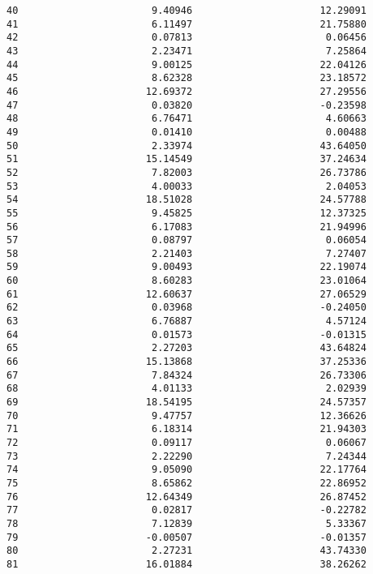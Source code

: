 \documentclass[11pt]{article}
\begin{document}
\begin{tcolorbox}[breakable, size=fbox, boxrule=.5pt, pad at break*=1mm, opacityfill=0]
\begin{Verbatim}[commandchars=\\\{\}]
40                       9.40946                      12.29091
41                       6.11497                      21.75880
42                       0.07813                       0.06456
43                       2.23471                       7.25864
44                       9.00125                      22.04126
45                       8.62328                      23.18572
46                      12.69372                      27.29556
47                       0.03820                      -0.23598
48                       6.76471                       4.60663
49                       0.01410                       0.00488
50                       2.33974                      43.64050
51                      15.14549                      37.24634
52                       7.82003                      26.73786
53                       4.00033                       2.04053
54                      18.51028                      24.57788
55                       9.45825                      12.37325
56                       6.17083                      21.94996
57                       0.08797                       0.06054
58                       2.21403                       7.27407
59                       9.00493                      22.19074
60                       8.60283                      23.01064
61                      12.60637                      27.06529
62                       0.03968                      -0.24050
63                       6.76887                       4.57124
64                       0.01573                      -0.01315
65                       2.27203                      43.64824
66                      15.13868                      37.25336
67                       7.84324                      26.73306
68                       4.01133                       2.02939
69                      18.54195                      24.57357
70                       9.47757                      12.36626
71                       6.18314                      21.94303
72                       0.09117                       0.06067
73                       2.22290                       7.24344
74                       9.05090                      22.17764
75                       8.65862                      22.86952
76                      12.64349                      26.87452
77                       0.02817                      -0.22782
78                       7.12839                       5.33367
79                      -0.00507                      -0.01357
80                       2.27231                      43.74330
81                      16.01884                      38.26262

\end{Verbatim}
\end{tcolorbox}
\end{document}
